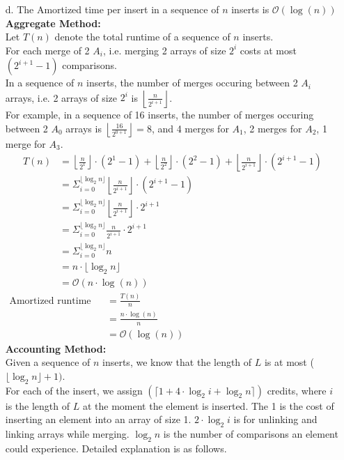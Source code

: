 \documentclass[10pt]{article}
\begin{document}
\begin{itemize}
\item[d.]The Amortized time per insert in a sequence of $n$ inserts is $\mathcal{O}(\log(n))$\\
\textbf{Aggregate Method:}\\
Let $T(n)$ denote the total runtime of a sequence of $n$ inserts.\\
For each merge of 2 $A_i$, i.e. merging 2 arrays of size $2^i$ costs at most $(2^{i+1}-1)$ comparisons.\\
In a sequence of $n$ inserts, the number of merges occuring between 2 $A_i$ arrays, i.e. 2 arrays of size $2^i$ is $\left\lfloor\frac{n}{2^{i+1}}\right\rfloor$.\\
For example, in a sequence of 16 inserts, the number of merges occuring between 2 $A_0$ arrays is $\left\lfloor\frac{16}{2^{0+1}}\right\rfloor = 8$, and 4 merges for $A_1$, 2 merges for $A_2$, 1 merge for $A_3$.
\begin{align*}
T(n) &= \left\lfloor\frac{n}{2^1}\right\rfloor\cdot(2^1-1)+\left\lfloor\frac{n}{2^2}\right\rfloor\cdot(2^2-1)+\left\lfloor\frac{n}{2^{i+1}}\right\rfloor\cdot(2^{i+1}-1)\\
&=\Sigma^{\lfloor\log_2n\rfloor}_{i=0}\left\lfloor\frac{n}{2^{i+1}}\right\rfloor\cdot(2^{i+1}-1)\\
&=\Sigma^{\lfloor\log_2n\rfloor}_{i=0}\left\lfloor\frac{n}{2^{i+1}}\right\rfloor\cdot2^{i+1}\\
&=\Sigma^{\lfloor\log_2n\rfloor}_{i=0}\frac{n}{2^{i+1}}\cdot2^{i+1}\\
&=\Sigma^{\lfloor\log_2n\rfloor}_{i=0}n\\
&=n\cdot\lfloor\log_2n\rfloor\\
&=\mathcal{O}(n\cdot\log(n))
\end{align*}
\begin{align*}
\text{Amortized runtime per insert}&=\frac{T(n)}{n}\hspace{20em}\\
&=\frac{n\cdot\log(n)}{n}\\
&=\mathcal{O}(\log(n))
\end{align*}
\textbf{Accounting Method:}\\
Given a sequence of $n$ inserts, we know that the length of $L$ is at most ($\lfloor\log_2n\rfloor + 1)$.\\
For each of the insert, we assign $(\lceil 1+4\cdot\log_2i+\log_2n\rceil)$ credits, where $i$ is the length of $L$ at the moment the element is inserted. The 1 is the cost of inserting an element into an array of size 1. $2\cdot\log_2i$ is for unlinking and linking arrays while merging. $\log_2n$ is the number of comparisons an element could experience. Detailed explanation is as follows.\\

\end{itemize}
\end{document}
